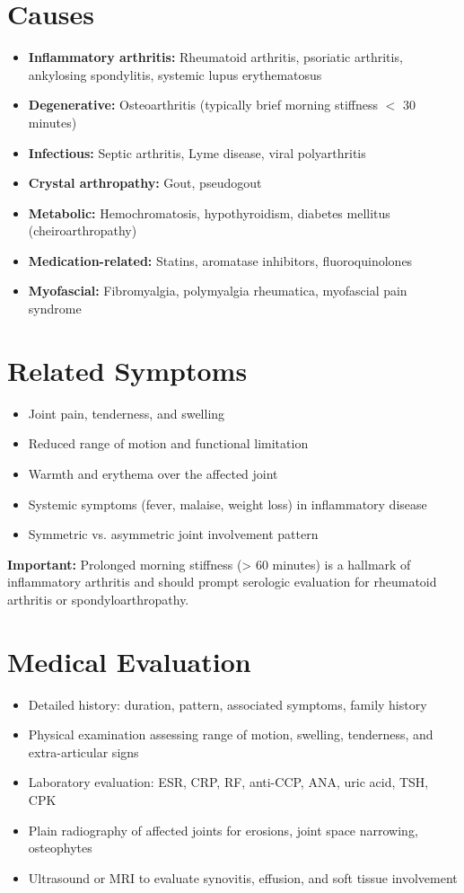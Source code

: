 \section*{Causes}
\begin{itemize}
  \item \textbf{Inflammatory arthritis:} Rheumatoid arthritis, psoriatic arthritis, ankylosing spondylitis, systemic lupus erythematosus
  \item \textbf{Degenerative:} Osteoarthritis (typically brief morning stiffness $<$ 30 minutes)
  \item \textbf{Infectious:} Septic arthritis, Lyme disease, viral polyarthritis
  \item \textbf{Crystal arthropathy:} Gout, pseudogout
  \item \textbf{Metabolic:} Hemochromatosis, hypothyroidism, diabetes mellitus (cheiroarthropathy)
  \item \textbf{Medication-related:} Statins, aromatase inhibitors, fluoroquinolones
  \item \textbf{Myofascial:} Fibromyalgia, polymyalgia rheumatica, myofascial pain syndrome
\end{itemize}

\section*{Related Symptoms}
\begin{itemize}
  \item Joint pain, tenderness, and swelling
  \item Reduced range of motion and functional limitation
  \item Warmth and erythema over the affected joint
  \item Systemic symptoms (fever, malaise, weight loss) in inflammatory disease
  \item Symmetric vs. asymmetric joint involvement pattern
\end{itemize}
\textbf{Important:} Prolonged morning stiffness (> 60 minutes) is a hallmark of inflammatory arthritis and should prompt serologic evaluation for rheumatoid arthritis or spondyloarthropathy.

\section*{Medical Evaluation}
\begin{itemize}
  \item Detailed history: duration, pattern, associated symptoms, family history
  \item Physical examination assessing range of motion, swelling, tenderness, and extra-articular signs
  \item Laboratory evaluation: ESR, CRP, RF, anti-CCP, ANA, uric acid, TSH, CPK
  \item Plain radiography of affected joints for erosions, joint space narrowing, osteophytes
  \item Ultrasound or MRI to evaluate synovitis, effusion, and soft tissue involvement
\end{itemize}

